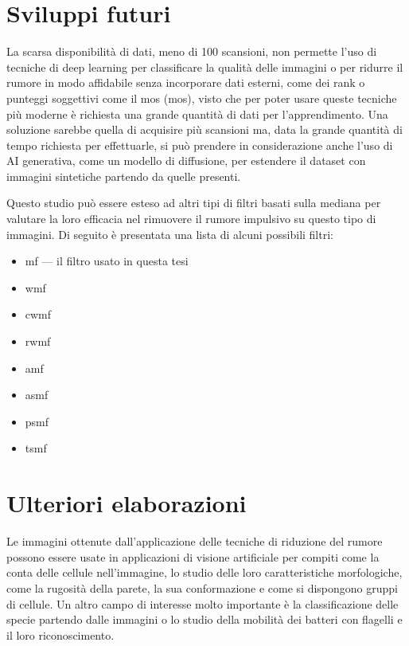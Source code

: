 \documentclass[../main.tex]{subfiles}
\begin{document}
\section{Sviluppi futuri}

La scarsa disponibilità di dati, meno di 100 scansioni, non permette l'uso di tecniche di deep learning per classificare la qualità delle immagini o per ridurre il rumore in modo affidabile senza incorporare dati esterni, come dei rank o punteggi soggettivi come il \acrshort{mos} (\acrlong{mos}), visto che per poter usare queste tecniche più moderne è richiesta una grande quantità di dati per l'apprendimento.\cite{lecun_2015,litjens_2017,bosse_2018} Una soluzione sarebbe quella di acquisire più scansioni ma, data la grande quantità di tempo richiesta per effettuarle, si può prendere in considerazione anche l'uso di AI generativa, come un modello di diffusione, per estendere il dataset con immagini sintetiche partendo da quelle presenti.\cite{ho_2020}

Questo studio può essere esteso ad altri tipi di filtri basati sulla mediana per valutare la loro efficacia nel rimuovere il rumore impulsivo su questo tipo di immagini. Di seguito è presentata una lista di alcuni possibili filtri:

\begin{itemize}
	\itemsep 0em
	\item \acrfull{mf}\cite{gallagher_1981} --- il filtro usato in questa tesi
	\item \acrfull{wmf}\cite{zhang_2009}
	\item \acrfull{cwmf}\cite{ko_1991}
	\item \acrfull{rwmf}\cite{kumar_2007}
	\item \acrfull{amf}\cite{chen_2001}
	\item \acrfull{asmf}\cite{khryashchev_2005}
	\item \acrfull{psmf}\cite{wang_1999}
	\item \acrfull{tsmf}\cite{chen_1999}
\end{itemize}

\section{Ulteriori elaborazioni}

Le immagini ottenute dall'applicazione delle tecniche di riduzione del rumore possono essere usate in applicazioni di visione artificiale per compiti come la conta delle cellule nell'immagine, lo studio delle loro caratteristiche morfologiche, come la rugosità della parete, la sua conformazione e come si dispongono gruppi di cellule. Un altro campo di interesse molto importante è la classificazione delle specie partendo dalle immagini o lo studio della mobilità dei batteri con flagelli e il loro riconoscimento.
\end{document}
